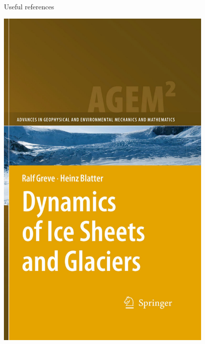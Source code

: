 \documentclass[aspectratio=169,xcolor=dvipsnames]{beamer}
\begin{document}
\begin{frame}{Useful references}
\begin{center}
\begin{minipage}{0.2\textwidth}
\begin{center}
\includegraphics[width=0.8\textwidth]{figs/Fig-Book-Greve-Blatter-2009.pdf}
\end{center}
\end{minipage}

\end{center}

\end{frame}

\appendix

\begin{frame}
\end{frame}

\end{document}
